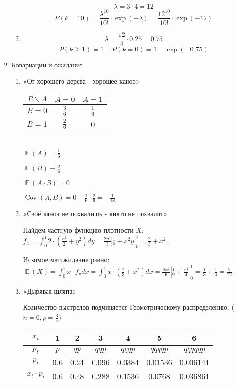 \documentclass[11pt, a4paper]{article}
\DeclareMathOperator{\Cov}{Cov}
\DeclareMathOperator{\E}{\mathbb{E}}
\renewcommand{\geq}{\geqslant}
\theoremstyle{definition}
\begin{document}
\begin{enumerate}
\begin{enumerate}
    \[
    \lambda = 3 \cdot 4 = 12
    \]
    \[
    P(k=10) = \frac{\lambda^{10}}{10!} \cdot \exp{(-\lambda)} = \frac{12^{10}}{10!} \cdot \exp{(-12)}
    \]
    
    \item 
    
    \[
    \lambda = \frac{12}{4} \cdot 0.25 = 0.75
    \]
    \[
    P(k \geq 1) = 1 - P(k=0) = 1 - \exp{(-0.75)}
    \]
    
\end{enumerate}    
    
    \item Ковариации и ожидание

\begin{enumerate}
    \item «От хорошего дерева - хорошее каноэ»
    
     \begin{tabular}{c|c|c}
			\hline $B \backslash A$ & $A=0$ & $A=1$  \\
			\hline  $B = 0$ & $\frac{3}{6}$ & $\frac{1}{6}$  \\
			\hline  $B = 1$ & $\frac{2}{6}$ & 0  \\
			\hline
		\end{tabular} \\
		
		$\E(A) = \frac{1}{6}$
		
		$\E(B) = \frac{2}{6}$
		
		$\E(A \cdot B) = 0$
		
		$\Cov(A,B) = 0 - \frac{1}{6} \cdot \frac{2}{6} = - \frac{1}{18}$
		
    \item «Своё каноэ не похвалишь - никто не похвалит»
    
    Найдем частную функцию плотности $X$:
    $f_x = \int_0^1 2 \cdot (\frac{x^2}{2} + y^2) dy = \frac{2y^3}{3}|_0^1 + x^2y|_0^1 = \frac{2}{3} + x^2$.
    
    Искомое матожидание равно:
    $\E(X) = \int_0^1 x \cdot f_x dx=\int_0^1 x \cdot (\frac{2}{3} + x^2) dx = \frac{2x^2}{6}|_0^1 + \frac{x^4}{4}|_0^1= \frac{1}{3} + \frac{1}{4} = \frac{7}{12}$.
    
    \item «Дырявая шляпа»
    
    Количество выстрелов подчиняется Геометрическому распределению. ($n = 6, p = \frac{3}{5}$)
    
    \begin{tabular}{c|c|c|c|c|c|c}
			\hline $x_t$ & 1 & 2 & 3 & 4 & 5 & 6 \\
			\hline  $p_t$ & $p$ & $qp$ & $qqp$ & $qqqp$ & $qqqqp$ & $qqqqqp$ \\
			\hline  $p_t$ & 0.6 & 0.24 & 0.096 & 0.0384 & 0.01536 & 0.006144 \\
			\hline  $x_t \cdot p_t$ & 0.6 & 0.48 & 0.288 & 0.1536 & 0.0768 & 0.036864 \\
			\hline
		\end{tabular} \\
		

\end{enumerate}
\end{enumerate}
\end{document}
